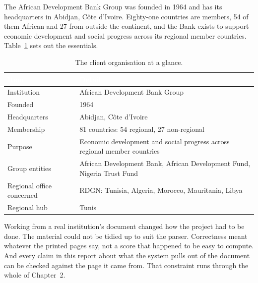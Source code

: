 The African Development Bank Group was founded in 1964 and has its headquarters
in Abidjan, C\^ote d'Ivoire. Eighty-one countries are members, 54 of them
African and 27 from outside the continent, and the Bank exists to support
economic development and social progress across its regional member countries.
Table~\ref{tab:afdb} sets out the essentials.

\begin{table}[h]
\centering
\caption{The client organisation at a glance.}
\label{tab:afdb}
\begin{tabular}{|p{}|p{}|}
\hline
\rowcolor{myblue}\textcolor{white}{\textbf{Item}} & \textcolor{white}{\textbf{Detail}} \\
\hline
Institution & African Development Bank Group \\ \hline
Founded & 1964 \\ \hline
Headquarters & Abidjan, C\^ote d'Ivoire \\ \hline
Membership & 81 countries: 54 regional, 27 non-regional \\ \hline
Purpose & Economic development and social progress across regional member countries \\ \hline
Group entities & African Development Bank, African Development Fund, Nigeria Trust Fund \\ \hline
Regional office concerned & RDGN: Tunisia, Algeria, Morocco, Mauritania, Libya \\ \hline
Regional hub & Tunis \\ \hline
\end{tabular}
\end{table}


Working from a real institution's document changed how the project had to be
done. The material could not be tidied up to suit the parser. Correctness meant
whatever the printed pages say, not a score that happened to be easy to compute.
And every claim in this report about what the system pulls out of the document
can be checked against the page it came from. That constraint runs through the
whole of Chapter~2.
